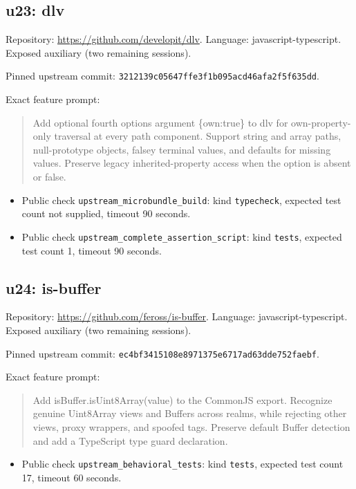 \documentclass[manuscript,screen,nonacm]{acmart}
\providecommand{\tightlist}{\setlength{\itemsep}{0pt}\setlength{\parskip}{0pt}}
\begin{document}
\subsection{u23: dlv}\label{u23-dlv}

Repository: \url{https://github.com/developit/dlv}. Language:
javascript-typescript. Exposed auxiliary (two remaining sessions).

Pinned upstream commit:
\nolinkurl{3212139c05647ffe3f1b095acd46afa2f5f635dd}.

Exact feature prompt:

\begin{quote}
Add optional fourth options argument \{own:true\} to dlv for
own-property-only traversal at every path component. Support string and
array paths, null-prototype objects, falsey terminal values, and
defaults for missing values. Preserve legacy inherited-property access
when the option is absent or false.
\end{quote}

\begin{itemize}
\tightlist
\item
  Public check \nolinkurl{upstream_microbundle_build}: kind
  \texttt{typecheck}, expected test count not supplied, timeout 90
  seconds.
\item
  Public check \nolinkurl{upstream_complete_assertion_script}: kind
  \texttt{tests}, expected test count 1, timeout 90 seconds.
\end{itemize}

\subsection{u24: is-buffer}\label{u24-is-buffer}

Repository: \url{https://github.com/feross/is-buffer}. Language:
javascript-typescript. Exposed auxiliary (two remaining sessions).

Pinned upstream commit:
\nolinkurl{ec4bf3415108e8971375e6717ad63dde752faebf}.

Exact feature prompt:

\begin{quote}
Add isBuffer.isUint8Array(value) to the CommonJS export. Recognize
genuine Uint8Array views and Buffers across realms, while rejecting
other views, proxy wrappers, and spoofed tags. Preserve default Buffer
detection and add a TypeScript type guard declaration.
\end{quote}

\begin{itemize}
\tightlist
\item
  Public check \nolinkurl{upstream_behavioral_tests}: kind
  \texttt{tests}, expected test count 17, timeout 60 seconds.
\end{itemize}
\end{document}
